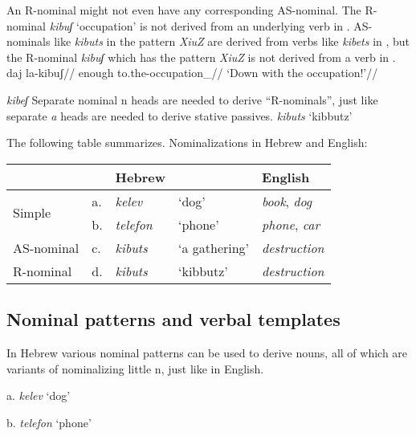 An R-nominal might not even have any corresponding AS-nominal. The R-nominal \emph{kibuʃ} `occupation' is not derived from an underlying verb in \tpie. AS-nominals like \emph{kibuts} in the pattern \emph{XiuZ} are derived from verbs like \emph{kibets} in \tpie, but the R-nominal \emph{kibuʃ} which has the pattern \emph{XiuZ} is not derived from a verb in \tpie.
\pex
	\a \begingl
		\gla daj la-kibuʃ//
		\glb enough to.the-occupation_{}//
		\glft `Down with the occupation!'//
	\endgl
	
	\a \ljudge{*} \emph{kibeʃ}
\xe
Separate nominal n heads are needed to derive ``R-nominals'', just like separate \emph{a} heads are needed to derive stative passives.
\ex
	\emph{kibuts} `kibbutz'\\
\xe

The following table summarizes.
\ex Nominalizations in Hebrew and English:\\
	\begin{tabular}{l|lll|l}
	 & & Hebrew & & English\\\hline
	\multirow{2}{*}{Simple}     & a. & \emph{kelev} & `dog' & \emph{book}, \emph{dog}\\
			&    b. & \emph{telefon} & `phone' & \emph{phone}, \emph{car}\\\hline
	AS-nominal & c. & \emph{kibuts} & `a gathering' & \emph{destruction}\\\hline
	R-nominal  & d. & \emph{kibuts} & `kibbutz'     & \emph{destruction}\\
	\end{tabular}
\xe


	\subsection{Nominal patterns and verbal templates}
In Hebrew various nominal patterns can be used to derive nouns, all of which are variants of nominalizing little n, just like in English.
\ex
	\begin{minipage}[t]{0.3\textwidth}
		a. \emph{kelev} `dog'\\
	\end{minipage}
	\begin{minipage}[t]{0.3\textwidth}
		b. \emph{telefon} `phone'\\
	\end{minipage}
\xe	


